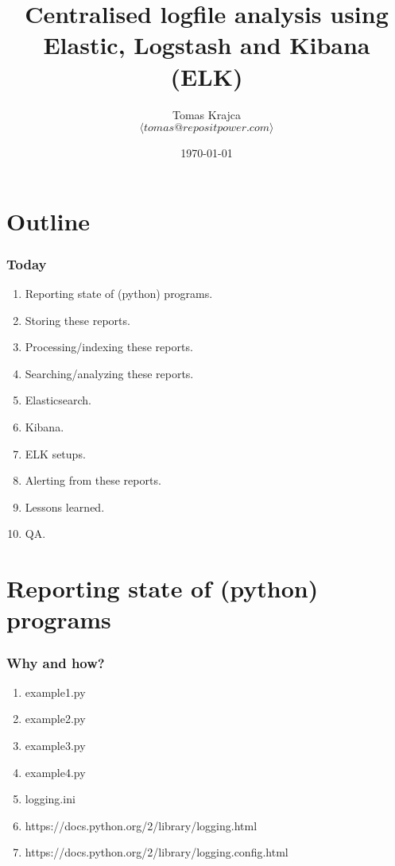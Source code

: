\documentclass[13pt, ignorenonframetext]{beamer}
\institute[PUG@Canberra]{PUG Meetup   \\
Canberra}
\title[Centralised logfile analysis using ELK]{Centralised logfile analysis using Elastic, Logstash and Kibana (ELK)}
\author[Tomas Krajca]{Tomas Krajca \\{\tiny $\langle tomas@repositpower.com \rangle$}}
\date{\today}
\begin{document}
\begin{frame}[plain]
	\titlepage
\end{frame}


\section{Outline}
\frame
{
  \frametitle{Today}
  \begin{enumerate}
  \item Reporting state of (python) programs.
  \item Storing these reports.
  \item Processing/indexing these reports.
  \item Searching/analyzing these reports.
  \item Elasticsearch.
  \item Kibana.
  \item ELK setups.
  \item Alerting from these reports.
  \item Lessons learned.
  \item QA.
  \end{enumerate}
}

\section{Reporting state of (python) programs}
\begin{frame}
\frametitle{Why and how?}
\begin{enumerate}
\item example1.py
\item example2.py
\item example3.py
\item example4.py
\item logging.ini
\item https://docs.python.org/2/library/logging.html
\item https://docs.python.org/2/library/logging.config.html
\end{enumerate}
\end{frame}
\end{document}

